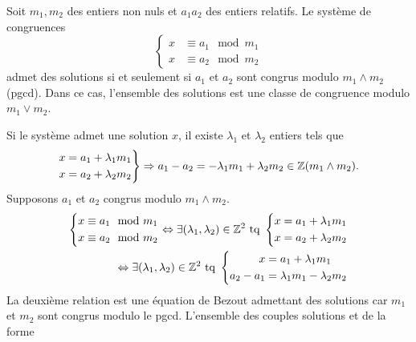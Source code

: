 \begin{propn}
  Soit $m_1, m_2$ des entiers non nuls et $a_1 a_2$ des entiers relatifs. Le système de congruences
  \begin{displaymath}
    \left\lbrace
      \begin{align*}
        x &\equiv a_1 \mod m_1 \\
        x &\equiv a_2 \mod m_2
      \end{align*}
    \right.
  \end{displaymath}
  admet des solutions si et seulement si $a_1$ et $a_2$ sont congrus modulo $m_1 \wedge m_2$ (pgcd). Dans ce cas, l'ensemble des solutions est une classe de congruence modulo $m_1 \vee m_2$.
\end{propn}
\begin{demo}
  Si le système admet une solution $x$, il existe $\lambda_1$ et $\lambda_2$ entiers tels que
  \begin{displaymath}
    \left.
    \begin{aligned}
      x &= a_1 + \lambda_1 m_1 \\
      x &= a_2 + \lambda_2 m_2
    \end{aligned}
    \right \rbrace \Rightarrow
    a_1 - a_2 = -\lambda_1 m_1 + \lambda_2 m_2 \in \mathbb{Z} (m_1 \wedge m_2).
  \end{displaymath}
  Supposons $a_1$ et $a_2$ congrus modulo $m_1 \wedge m_2$.
  \begin{align*}
        \left\lbrace
      \begin{aligned}
        x &\equiv a_1 \mod m_1 \\
        x &\equiv a_2 \mod m_2
      \end{aligned}
    \right.
    \Leftrightarrow \exists (\lambda_1, \lambda_2) \in \mathbb{Z}^2 \text{ tq }
            \left\lbrace
      \begin{aligned}
        x &= a_1 + \lambda_1 m_1 \\
        x &= a_2 + \lambda_2 m_2
      \end{aligned}
    \right. \\
    \Leftrightarrow \exists (\lambda_1, \lambda_2) \in \mathbb{Z}^2 \text{ tq }
            \left\lbrace
      \begin{aligned}
        x &= a_1 + \lambda_1 m_1 \\
        a_2 - a_1 &= \lambda_1 m_1 - \lambda_2 m_2
      \end{aligned}
    \right.
  \end{align*}
  La deuxième relation est une équation de Bezout admettant des solutions car $m_1$ et $m_2$ sont congrus modulo le pgcd. L'ensemble des couples solutions et de la forme

\end{demo}
